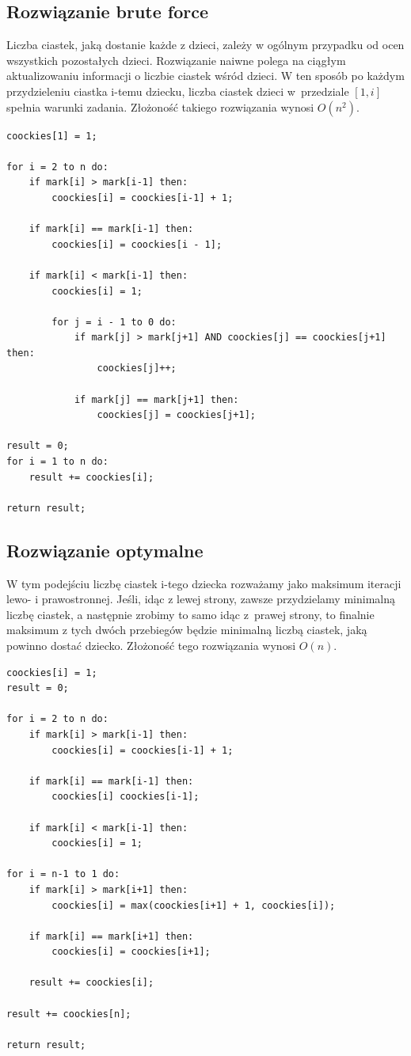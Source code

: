 \documentclass{article}
\begin{document}
	\subsection{Rozwiązanie brute force}
		Liczba ciastek, jaką dostanie każde z dzieci, zależy w ogólnym przypadku od ocen wszystkich pozostałych dzieci. Rozwiązanie naiwne polega na ciągłym aktualizowaniu informacji o liczbie ciastek wśród dzieci. W ten sposób po każdym przydzieleniu ciastka i-temu dziecku, liczba ciastek dzieci w~przedziale $[1, i]$ spełnia warunki zadania. Złożoność takiego rozwiązania wynosi $O(n^2)$.
		\begin{lstlisting}[tabsize=2,frame=single]
coockies[1] = 1;

for i = 2 to n do:
	if mark[i] > mark[i-1] then:
	 	coockies[i] = coockies[i-1] + 1;

	if mark[i] == mark[i-1] then:
		coockies[i] = coockies[i - 1];

	if mark[i] < mark[i-1] then:
		coockies[i] = 1;

		for j = i - 1 to 0 do:
			if mark[j] > mark[j+1] AND coockies[j] == coockies[j+1] then:
				coockies[j]++;

			if mark[j] == mark[j+1] then:
				coockies[j] = coockies[j+1];

result = 0;
for i = 1 to n do:
	result += coockies[i];

return result;
		\end{lstlisting}

	\newpage
	\subsection{Rozwiązanie optymalne}
		W tym podejściu liczbę ciastek i-tego dziecka rozważamy jako maksimum iteracji lewo- i prawostronnej. Jeśli, idąc z lewej strony, zawsze przydzielamy minimalną liczbę ciastek, a następnie zrobimy to samo idąc z~prawej strony, to finalnie maksimum z tych dwóch przebiegów będzie minimalną liczbą ciastek, jaką powinno dostać dziecko. Złożoność tego rozwiązania wynosi $O(n)$.
		\begin{lstlisting}[tabsize=2, frame=single]
coockies[i] = 1;
result = 0;

for i = 2 to n do:
	if mark[i] > mark[i-1] then:
		coockies[i] = coockies[i-1] + 1;

	if mark[i] == mark[i-1] then:
		coockies[i] coockies[i-1];

	if mark[i] < mark[i-1] then:
		coockies[i] = 1;

for i = n-1 to 1 do:
	if mark[i] > mark[i+1] then:
		coockies[i] = max(coockies[i+1] + 1, coockies[i]);

	if mark[i] == mark[i+1] then:
		coockies[i] = coockies[i+1];

	result += coockies[i];

result += coockies[n];

return result;

		\end{lstlisting}
\end{document}
